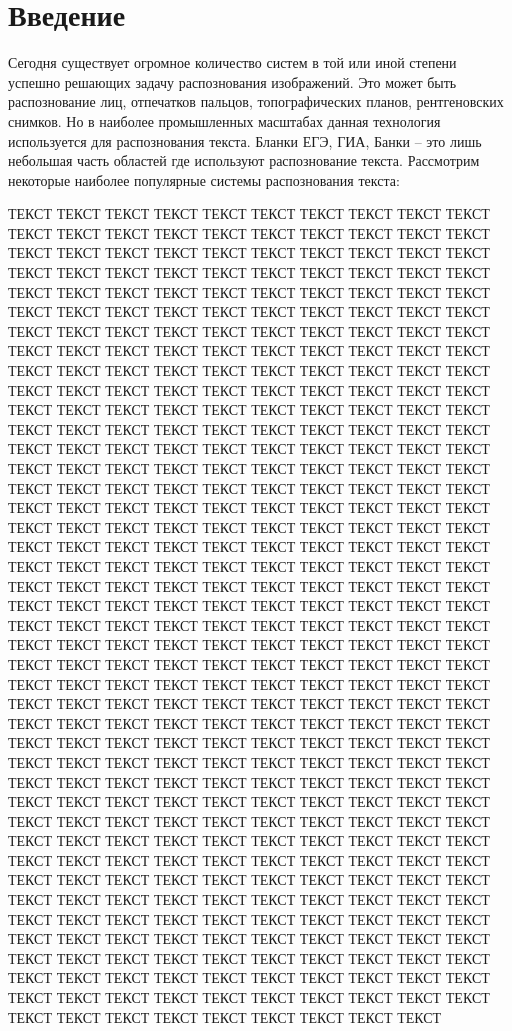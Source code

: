 \chapter*{Введение}							%
Сегодня существует огромное количество систем в той или иной степени успешно решающих задачу распознования изображений. Это может быть распознование лиц, отпечатков пальцов, топографических планов, рентгеновских снимков. Но в наиболее промышленных масштабах данная технология используется для распознования текста. Бланки ЕГЭ, ГИА, Банки -- это лишь небольшая часть областей где используют распознование текста.
Рассмотрим некоторые наиболее популярные системы распознования текста:

ТЕКСТ ТЕКСТ ТЕКСТ ТЕКСТ ТЕКСТ ТЕКСТ ТЕКСТ ТЕКСТ ТЕКСТ ТЕКСТ ТЕКСТ ТЕКСТ ТЕКСТ ТЕКСТ ТЕКСТ ТЕКСТ ТЕКСТ ТЕКСТ ТЕКСТ ТЕКСТ ТЕКСТ ТЕКСТ ТЕКСТ ТЕКСТ ТЕКСТ ТЕКСТ ТЕКСТ ТЕКСТ ТЕКСТ ТЕКСТ ТЕКСТ ТЕКСТ ТЕКСТ ТЕКСТ ТЕКСТ ТЕКСТ ТЕКСТ ТЕКСТ ТЕКСТ ТЕКСТ ТЕКСТ ТЕКСТ ТЕКСТ ТЕКСТ ТЕКСТ ТЕКСТ ТЕКСТ ТЕКСТ ТЕКСТ ТЕКСТ ТЕКСТ ТЕКСТ ТЕКСТ ТЕКСТ ТЕКСТ ТЕКСТ ТЕКСТ ТЕКСТ ТЕКСТ ТЕКСТ ТЕКСТ ТЕКСТ ТЕКСТ ТЕКСТ ТЕКСТ ТЕКСТ ТЕКСТ ТЕКСТ ТЕКСТ ТЕКСТ ТЕКСТ ТЕКСТ ТЕКСТ ТЕКСТ ТЕКСТ ТЕКСТ ТЕКСТ ТЕКСТ ТЕКСТ ТЕКСТ ТЕКСТ ТЕКСТ ТЕКСТ ТЕКСТ ТЕКСТ ТЕКСТ ТЕКСТ ТЕКСТ ТЕКСТ ТЕКСТ ТЕКСТ ТЕКСТ ТЕКСТ ТЕКСТ ТЕКСТ ТЕКСТ ТЕКСТ ТЕКСТ ТЕКСТ ТЕКСТ ТЕКСТ ТЕКСТ ТЕКСТ ТЕКСТ ТЕКСТ ТЕКСТ ТЕКСТ ТЕКСТ ТЕКСТ ТЕКСТ ТЕКСТ ТЕКСТ ТЕКСТ ТЕКСТ ТЕКСТ ТЕКСТ ТЕКСТ ТЕКСТ ТЕКСТ ТЕКСТ ТЕКСТ ТЕКСТ ТЕКСТ ТЕКСТ ТЕКСТ ТЕКСТ ТЕКСТ ТЕКСТ ТЕКСТ ТЕКСТ ТЕКСТ ТЕКСТ ТЕКСТ ТЕКСТ ТЕКСТ ТЕКСТ ТЕКСТ ТЕКСТ ТЕКСТ ТЕКСТ ТЕКСТ ТЕКСТ ТЕКСТ ТЕКСТ ТЕКСТ ТЕКСТ ТЕКСТ ТЕКСТ ТЕКСТ ТЕКСТ ТЕКСТ ТЕКСТ ТЕКСТ ТЕКСТ ТЕКСТ ТЕКСТ ТЕКСТ ТЕКСТ ТЕКСТ ТЕКСТ ТЕКСТ ТЕКСТ ТЕКСТ ТЕКСТ ТЕКСТ ТЕКСТ ТЕКСТ ТЕКСТ ТЕКСТ ТЕКСТ ТЕКСТ ТЕКСТ ТЕКСТ ТЕКСТ ТЕКСТ ТЕКСТ ТЕКСТ ТЕКСТ ТЕКСТ ТЕКСТ ТЕКСТ ТЕКСТ ТЕКСТ ТЕКСТ ТЕКСТ ТЕКСТ ТЕКСТ ТЕКСТ ТЕКСТ ТЕКСТ ТЕКСТ ТЕКСТ ТЕКСТ ТЕКСТ ТЕКСТ ТЕКСТ ТЕКСТ ТЕКСТ ТЕКСТ ТЕКСТ ТЕКСТ ТЕКСТ ТЕКСТ ТЕКСТ ТЕКСТ ТЕКСТ ТЕКСТ ТЕКСТ ТЕКСТ ТЕКСТ ТЕКСТ ТЕКСТ ТЕКСТ ТЕКСТ ТЕКСТ ТЕКСТ ТЕКСТ ТЕКСТ ТЕКСТ ТЕКСТ ТЕКСТ ТЕКСТ ТЕКСТ ТЕКСТ ТЕКСТ ТЕКСТ ТЕКСТ ТЕКСТ ТЕКСТ ТЕКСТ ТЕКСТ ТЕКСТ ТЕКСТ ТЕКСТ ТЕКСТ ТЕКСТ ТЕКСТ ТЕКСТ ТЕКСТ ТЕКСТ ТЕКСТ ТЕКСТ ТЕКСТ ТЕКСТ ТЕКСТ ТЕКСТ ТЕКСТ ТЕКСТ ТЕКСТ ТЕКСТ ТЕКСТ ТЕКСТ ТЕКСТ ТЕКСТ ТЕКСТ ТЕКСТ ТЕКСТ ТЕКСТ ТЕКСТ ТЕКСТ ТЕКСТ ТЕКСТ ТЕКСТ ТЕКСТ ТЕКСТ ТЕКСТ ТЕКСТ ТЕКСТ ТЕКСТ ТЕКСТ ТЕКСТ ТЕКСТ ТЕКСТ ТЕКСТ ТЕКСТ ТЕКСТ ТЕКСТ ТЕКСТ ТЕКСТ ТЕКСТ ТЕКСТ ТЕКСТ ТЕКСТ ТЕКСТ ТЕКСТ ТЕКСТ ТЕКСТ ТЕКСТ ТЕКСТ ТЕКСТ ТЕКСТ ТЕКСТ ТЕКСТ ТЕКСТ ТЕКСТ ТЕКСТ ТЕКСТ ТЕКСТ ТЕКСТ ТЕКСТ ТЕКСТ ТЕКСТ ТЕКСТ ТЕКСТ ТЕКСТ ТЕКСТ ТЕКСТ ТЕКСТ ТЕКСТ ТЕКСТ ТЕКСТ ТЕКСТ ТЕКСТ ТЕКСТ ТЕКСТ ТЕКСТ ТЕКСТ ТЕКСТ ТЕКСТ ТЕКСТ ТЕКСТ ТЕКСТ ТЕКСТ ТЕКСТ ТЕКСТ ТЕКСТ ТЕКСТ ТЕКСТ ТЕКСТ ТЕКСТ ТЕКСТ ТЕКСТ ТЕКСТ ТЕКСТ ТЕКСТ ТЕКСТ ТЕКСТ ТЕКСТ ТЕКСТ ТЕКСТ ТЕКСТ ТЕКСТ ТЕКСТ ТЕКСТ ТЕКСТ ТЕКСТ ТЕКСТ ТЕКСТ ТЕКСТ ТЕКСТ ТЕКСТ ТЕКСТ ТЕКСТ ТЕКСТ ТЕКСТ ТЕКСТ ТЕКСТ ТЕКСТ ТЕКСТ ТЕКСТ ТЕКСТ ТЕКСТ ТЕКСТ ТЕКСТ ТЕКСТ ТЕКСТ ТЕКСТ ТЕКСТ ТЕКСТ ТЕКСТ ТЕКСТ ТЕКСТ ТЕКСТ ТЕКСТ ТЕКСТ ТЕКСТ ТЕКСТ ТЕКСТ ТЕКСТ ТЕКСТ ТЕКСТ ТЕКСТ ТЕКСТ ТЕКСТ ТЕКСТ ТЕКСТ ТЕКСТ ТЕКСТ ТЕКСТ ТЕКСТ ТЕКСТ ТЕКСТ ТЕКСТ ТЕКСТ ТЕКСТ ТЕКСТ ТЕКСТ ТЕКСТ ТЕКСТ ТЕКСТ ТЕКСТ ТЕКСТ ТЕКСТ ТЕКСТ ТЕКСТ ТЕКСТ ТЕКСТ ТЕКСТ ТЕКСТ ТЕКСТ ТЕКСТ ТЕКСТ ТЕКСТ ТЕКСТ ТЕКСТ ТЕКСТ ТЕКСТ ТЕКСТ ТЕКСТ 